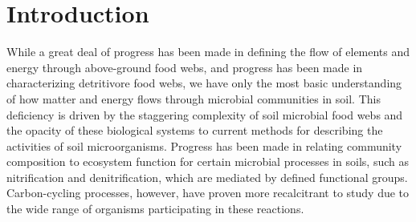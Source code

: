 \section{Introduction}
While a great deal of progress has been made in defining the flow of elements and energy through above-ground food webs, and progress has been made in characterizing detritivore food webs, we have only the most basic understanding of how matter and energy flows through microbial communities in soil. This deficiency is driven by the staggering complexity of soil microbial food webs and the opacity of these biological systems to current methods for describing the activities of soil microorganisms. Progress has been made in relating community composition to ecosystem function for certain microbial processes in soils, such as nitrification and denitrification, which are mediated by defined functional groups. Carbon-cycling processes, however, have proven more recalcitrant to study due to the wide range of organisms participating in these reactions.
 
